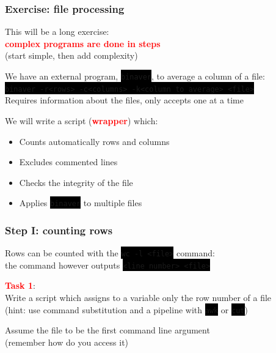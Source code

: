 \documentclass[unknownkeysallowed, 10pt, a4 paper, handout]{beamer}
\newcommand{\focus}[1]{\textbf{\textcolor{red}{#1}}}
\newcommand{\code}[1]{\colorbox{black}{\color{green}\texttt{#1}}}
\begin{document}
\begin{frame}
	\begin{center}
		\frametitle{Exercise: file processing}

		This will be a long exercise:\\
		\focus{complex programs are done in steps}\\
		(start simple, then add complexity)

		\vspace{3mm}
	
		We have an external program, \code{binaver}, to average a column of a file:\\
		\code{binaver -r<rows> -c<columns> -k<column to average> <file>}\\
		Requires information about the files, only accepts one at a time

		\vspace{3mm}

		We will write a script (\focus{wrapper}) which:

		\begin{itemize}
			\item Counts automatically rows and columns
			\item Excludes commented lines
			\item Checks the integrity of the file
			\item Applies \code{binaver} to multiple files
		\end{itemize}
	\end{center}
\end{frame}

\begin{frame}
	\begin{center}
		\frametitle{Step I: counting rows}

		Rows can be counted with the \code{wc -l <file>} command:\\
		the command however outputs \code{<line number> <file>}

		\vspace{8mm}

		\focus{Task 1}:\\
		Write a script which assigns to a variable only the row number of a file\\
		(hint: use command substitution and a pipeline with \code{awk} or \code{cut})

		Assume the file to be the first command line argument\\
		(remember how do you access it)
	\end{center}
\end{frame}
\end{document}
